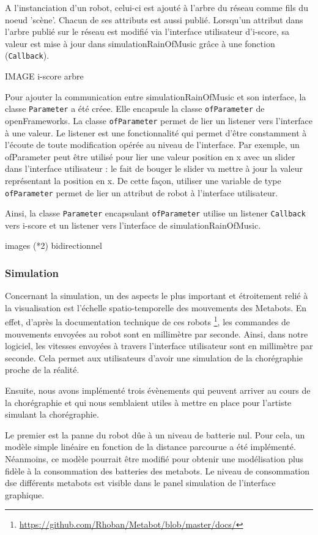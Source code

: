A l'instanciation d'un robot, celui-ci est ajouté à l'arbre du réseau comme fils du noeud 'scène'. Chacun de ses attributs est aussi publié. Lorsqu'un attribut dans l'arbre publié sur le réseau est modifié via l'interface utilisateur d'i-score, sa valeur est mise à jour dans simulationRainOfMusic grâce à une fonction (\verb|Callback|).

IMAGE i-score arbre

Pour ajouter la communication entre simulationRainOfMusic et son interface, la classe \verb|Parameter| a été créee. Elle encapsule la classe \verb|ofParameter| de openFrameworks. La classe \verb|ofParameter| permet de lier un listener vers l'interface à une valeur. Le listener est une fonctionnalité qui permet d'être constamment à l'écoute de toute modification opérée au niveau de l'interface. Par exemple, un ofParameter peut être utilisé pour lier une valeur position en x avec un slider dans l'interface utilisateur : le fait de bouger le slider va mettre à jour la valeur représentant la position en x. De cette façon, utiliser une variable de type \verb|ofParameter| permet de lier un attribut de robot à l'interface utilisateur. 

Ainsi, la classe \verb|Parameter| encapsulant \verb|ofParameter| utilise un listener \verb|Callback| vers i-score et un listener vers l'interface de simulationRainOfMusic.

images (*2) bidirectionnel

\subsubsection{Simulation}

Concernant la simulation, un des aspects le plus important et étroitement relié à la visualisation est l'échelle spatio-temporelle des mouvements des Metabots. En effet, d'après la documentation technique de ces robots \footnote{\url{https://github.com/Rhoban/Metabot/blob/master/docs/}}, les commandes de mouvements envoyées au robot sont en millimètre par seconde. Ainsi, dans notre logiciel, les vitesses envoyées à travers l'interface utilisateur sont en millimètre par seconde. Cela permet aux utilisateurs d'avoir une simulation de la chorégraphie proche de la réalité.

Ensuite, nous avons implémenté trois évènements qui peuvent arriver au cours de la chorégraphie et qui nous semblaient utiles à mettre en place pour l'artiste simulant la chorégraphie. 

Le premier est la panne du robot dûe à un niveau de batterie nul. Pour cela, un modèle simple linéaire en fonction de la distance parcourue a été implémenté. Néanmoins, ce modèle pourrait être modifié pour obtenir une modélisation plus fidèle à la consommation des batteries des metabots. Le niveau de consommation dse différents metabots est visible dans le panel simulation de l'interface graphique. 

